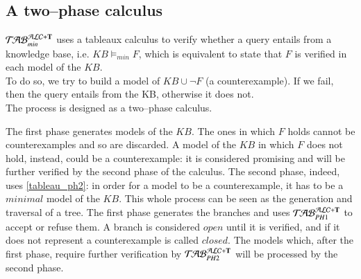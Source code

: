 \documentclass[a4paper, 11pt, oneside]{elsarticle}
\newcommand{\tip}{{\bf T}}
\newcommand{\unione} {\cup}
\newcommand{\nuovoc}{\mathrel{{\mathcal{T}\!\mathcal{AB}}}_{min}^{\mathcal{ALC}+\mbox{\scriptsize $\tip$}}}
\newcommand{\primo}{\mathrel{{\mathcal{T}\!\mathcal{AB}}}_{PH 1}^{\mathcal{ALC}+\mbox{\scriptsize $\tip$}}}
\newcommand{\secondo}{\mathrel{{\mathcal{T}\!\mathcal{AB}}}_{PH 2}^{\mathcal{ALC}+\mbox{\scriptsize $\tip$}}}
\begin{document}
\subsection{A two--phase calculus}\label{calc_2ph}

$\nuovoc$ uses a tableaux calculus to verify whether a query entails from a knowledge base, i.e. $KB \models_{min} F$, which is equivalent to state that $F$ is verified in each model of the $KB$.\\
To do so, we try to build a model of $KB \unione \neg F$ (a counterexample). If we fail, then the query entails from the KB, otherwise it does not.\\

The process is designed as a two--phase calculus.

The first phase generates models of the $KB$. The ones in which $F$ holds cannot be counterexamples and so are discarded. A model of the $KB$ in which $F$ does not hold, instead, could be a counterexample: it is considered promising and will be further verified by the second phase of the calculus.
The second phase, indeed, uses \ref{tableau_ph2}: in order for a model to be a counterexample, it has to be a $minimal$ model of the $KB$.
This whole process can be seen as the generation and traversal of a tree.
The first phase generates the branches and uses $\primo$ to accept or refuse them.
A branch is considered $open$ until it is verified, and if it does not represent a counterexample is called $closed$. The models which, after the first phase, require further verification by $\secondo$ will be processed by the second phase.\\
\end{document}
